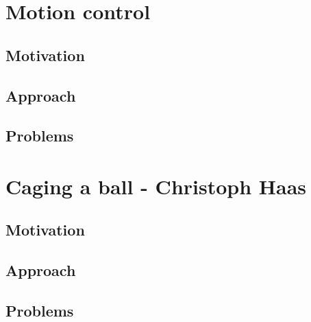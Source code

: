 \documentclass[703031]{iisreport}
\begin{document}
\section{Motion control}
\label{sec:motion}
\subsection{Motivation}

\subsection{Approach}

\subsection{Problems}


\section{Caging a ball - Christoph Haas}
\label{sec:caging}
\subsection{Motivation}

\subsection{Approach}

\subsection{Problems}
\end{document}
